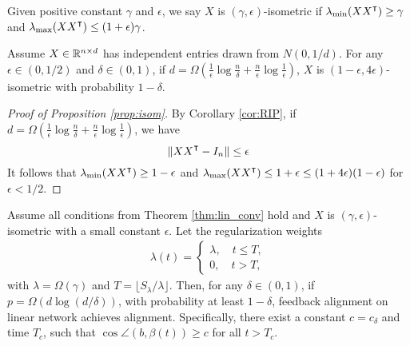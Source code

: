 \begin{definition}
Given positive constant $\gamma$ and $\epsilon$, we say $X$ is $(\gamma, \epsilon)$-isometric if 
$\lambda_{\min}(XX\transpose)\geq\gamma$ and $\lambda_{\max}(XX\transpose)\leq(1+\epsilon)\gamma$.
\end{definition}

\begin{proposition}
\label{prop:isom}
Assume $X\in\mathbb{R}^{n\times d}$ has independent entries drawn from $N(0,1/d)$. For any $\epsilon \in (0,1/2)$ and $\delta \in (0,1)$, if $d=\Omega(\frac{1}{\epsilon}\log\frac{n}{\delta}+\frac{n}{\epsilon}\log \frac{1}{\epsilon})$, $X$ is $(1-\epsilon, 4\epsilon)$-isometric with probability $1-\delta$.
\end{proposition}
\begin{proof}[Proof of Proposition \ref{prop:isom}]
By Corollary \ref{cor:RIP}, if $d=\Omega(\frac{1}{\epsilon}\log\frac{n}{\delta}+\frac{n}{\epsilon}\log \frac{1}{\epsilon})$, we have 
\begin{equation*}
\|XX\transpose - I_n\|\leq \epsilon 
\end{equation*}
It follows that $\lambda_{\min}(XX\transpose)\geq 1-\epsilon$ and $\lambda_{\max}(XX\transpose)\leq 1+\epsilon \leq (1+4\epsilon)(1-\epsilon)$ for $\epsilon <1/2$.
\end{proof}


\begin{theorem}
\label{thm:lin_align}
Assume all conditions from Theorem \ref{thm:lin_conv} hold and $X$ is $(\gamma, \epsilon)$-isometric with a small constant $\epsilon$. Let the regularization weights
\begin{align*}
\lambda(t) = 
\begin{cases}
    \lambda, \quad t\leq T,\\
    0, \quad t > T,
\end{cases}
\end{align*}
with $\lambda=\Omega(\gamma)$ and $T = \lfloor S_\lambda/\lambda\rfloor$. Then, for any $\delta\in(0,1)$, if $p = \Omega(d\log(d/\delta))$, with probability at least $1-\delta$, feedback alignment on linear network achieves alignment. Specifically, there exist a constant $c=c_\delta$ and time $T_c$, such that $\cos\angle(b, \beta(t))\geq c$ for all $t>T_c$.
\end{theorem}

